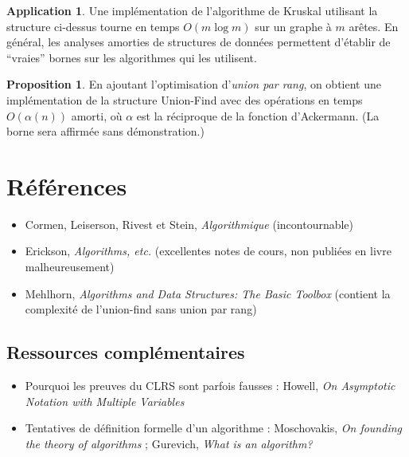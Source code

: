 \documentclass[a5paper, 10pt]{article}
\theoremstyle{definition}
\newtheorem{proposition}[equation]{Proposition}
\newtheorem{application}[equation]{Application}
\newcounter{n}
\begin{document}
\begin{application}
  Une implémentation de l'algorithme de Kruskal utilisant la structure ci-dessus
  tourne en temps $O(m \log m)$ sur un graphe à $m$ arêtes. En général, les
  analyses amorties de structures de données permettent d'établir de
  \enquote{vraies} bornes sur les algorithmes qui les utilisent.
\end{application}

\begin{proposition}
  En ajoutant l'optimisation d'\emph{union par rang}, on obtient une
  implémentation de la structure Union-Find avec des opérations en temps
  $O(\alpha(n))$ amorti, où $\alpha$ est la réciproque de la fonction
  d'Ackermann. (La borne sera affirmée sans démonstration.)
\end{proposition}

\section*{Références}

\begin{itemize}
\item Cormen, Leiserson, Rivest et Stein, \emph{Algorithmique} (incontournable)
\item Erickson, \emph{Algorithms, etc.} (excellentes notes de cours, non
  publiées en livre malheureusement)
\item Mehlhorn, \emph{Algorithms and Data Structures: The Basic Toolbox}
  (contient la complexité de l'union-find sans union par rang)
\end{itemize}

\subsection*{Ressources complémentaires}

\begin{itemize}
\item Pourquoi les preuves du CLRS sont parfois fausses : Howell, \emph{On Asymptotic
    Notation with Multiple Variables}
\item Tentatives de définition formelle d'un algorithme : Moschovakis, \emph{On
    founding the theory of algorithms} ; Gurevich, \emph{What is an algorithm?}
\end{itemize}
\end{document}
